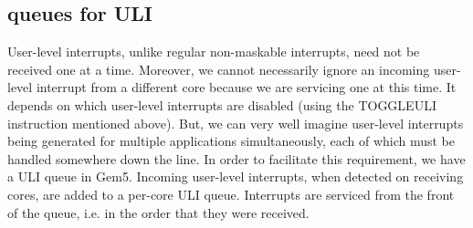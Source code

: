 \subsection{queues for ULI}\label{sec:uli_queue}
User-level interrupts, unlike regular non-maskable interrupts, need not be
received one at a time. Moreover, we cannot necessarily ignore an incoming
user-level interrupt from a different core because we are servicing one at this
time. It depends on which user-level interrupts are disabled (using the
TOGGLEULI instruction mentioned above). But, we can very well imagine
user-level interrupts being generated for multiple applications simultaneously,
each of which must be handled somewhere down the line. In order to facilitate
this requirement, we have a ULI queue in Gem5. Incoming user-level interrupts,
when detected on receiving cores, are added to a per-core ULI queue. Interrupts
are serviced from the front of the queue, i.e. in the order that they were
received.
